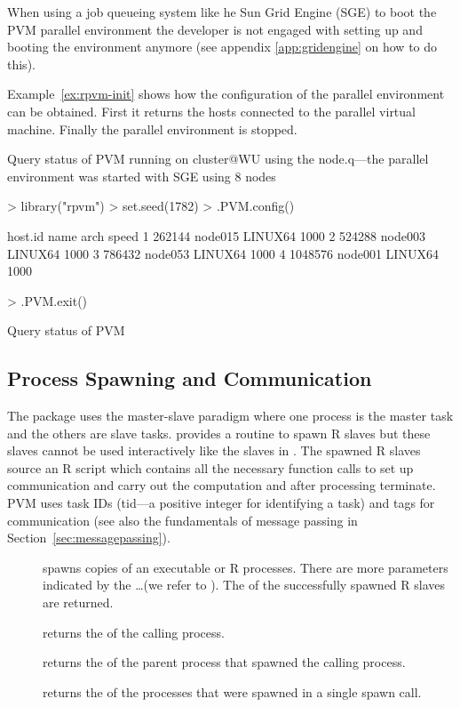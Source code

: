 When using a job queueing system like he Sun Grid Engine (SGE) to boot
the PVM parallel environment the developer is not engaged with
setting up and booting the environment anymore (see
appendix \ref{app:gridengine} on how to do this).

Example~\ref{ex:rpvm-init} shows how the configuration of the parallel
environment can be obtained. First it returns the hosts connected to
the parallel virtual machine. Finally the
parallel environment is stopped. 

\begin{Example} Query status of PVM \newline
running on cluster@WU using the node.q---the parallel environment was
started with SGE using 8 nodes

\begin{Schunk}
\begin{Sinput}
> library("rpvm")
> set.seed(1782)
> .PVM.config()
\end{Sinput}
\begin{Soutput}
  host.id    name    arch speed
1  262144 node015 LINUX64  1000
2  524288 node003 LINUX64  1000
3  786432 node053 LINUX64  1000
4 1048576 node001 LINUX64  1000
\end{Soutput}
\begin{Sinput}
> .PVM.exit()
\end{Sinput}
\end{Schunk}
\caption{Query status of PVM}
\label{ex:rpvminit}
\end{Example}

\subsection{Process Spawning and Communication}

The package  uses the master-slave paradigm where one
process is the master task and the others are slave tasks. 
provides a routine to spawn R slaves but these slaves cannot be used
interactively like the slaves in . The spawned R slaves
source an R script which contains all the necessary function calls to
set up communication and carry out the computation and after
processing terminate.
PVM uses task IDs (tid---a positive integer for identifying a task)
and tags for communication (see
also the fundamentals of message passing in
Section~\ref{sec:messagepassing}).

\begin{description}
\item[] spawns 
  copies 
  of an executable or  R processes. There are more
  parameters indicated by the \ldots (we refer to
  \cite{nali07rpvm}). The  of the successfully spawned R
  slaves are returned.
\item[] returns the  of the calling
  process.
\item[] returns the  of the parent
  process that spawned the calling process.
\item[] returns the  of the processes
  that were spawned in a single spawn call.
\end{description}

